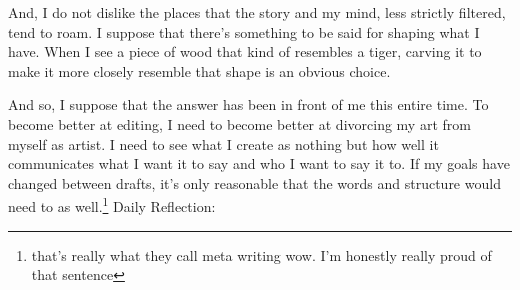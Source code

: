 \documentclass[12pt]{article}[titlepage]
\newcommand{\1}{\={a}}
\newcommand{\2}{\={e}}
\newcommand{\3}{\={\i}}
\newcommand{\4}{\=o}
\newcommand{\5}{\=u}
\newcommand{\6}{\={A}}
\renewcommand{\,}{\textsuperscript{,}}
\begin{document}
And, I do not dislike the places that the story and my mind, less strictly filtered, tend to roam.
I suppose that there's something to be said for shaping what I have.
When I see a piece of wood that kind of resembles a tiger, carving it to make it more closely resemble that shape is an obvious choice.

And so, I suppose that the answer has been in front of me this entire time.
To become better at editing, I need to become better at divorcing my art from myself as artist.
I need to see what I create as nothing but how well it communicates what I want it to say and who I want to say it to.
If my goals have changed between drafts, it's only reasonable that the words and structure would need to as well.\footnote{that's really what they call meta writing wow. I'm honestly really proud of that sentence}
Daily Reflection:
\end{document}
